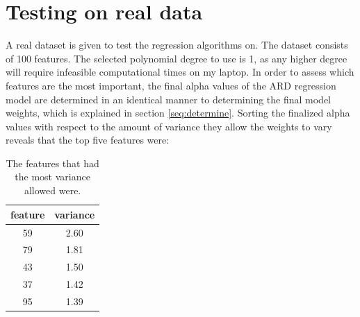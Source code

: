 \documentclass[12pt]{article}
\begin{document}
    \section{Testing on real data}
    A real dataset is given to test the regression algorithms on. The dataset consists of 100 features. The selected polynomial degree to use is 1, as any higher degree will require infeasible computational times on my laptop. In order to assess which features are the most important, the final alpha values of the ARD regression model are determined in an identical manner to determining the final model weights, which is explained in section \ref{seq:determine}. Sorting the finalized alpha values with respect to the amount of variance they allow the weights to vary reveals that the top five features were:
    \begin{table}[H]
        \centering
        \caption{The features that had the most variance allowed were.}
        \begin{tabular}{c|c}
            \toprule
            feature & variance \\ 
            \midrule
            59 & 2.60\\
            79 & 1.81\\
            43 & 1.50\\
            37 & 1.42\\
            95 & 1.39\\
            \bottomrule
        \end{tabular}
    \end{table}
\end{document}
